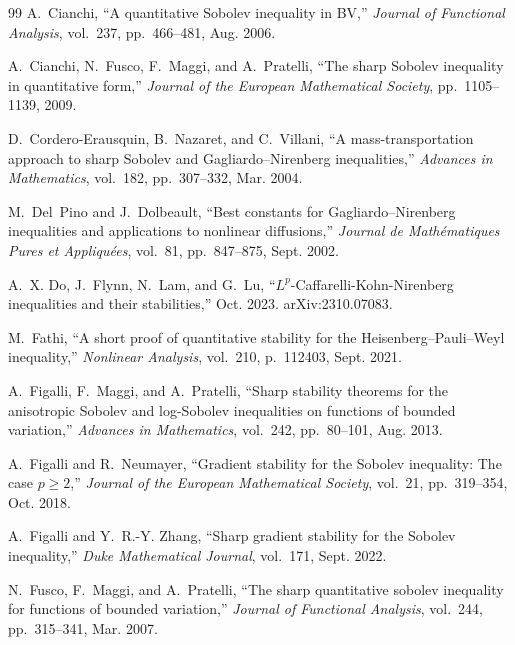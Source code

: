 \documentclass[11pt]{article}
\numberwithin{equation}{section}
\begin{document}
\begin{thebibliography}{99}
A.~Cianchi, ``A quantitative {Sobolev} inequality in {BV},'' {\em Journal of
  Functional Analysis}, vol.~237, pp.~466--481, Aug. 2006.


A.~Cianchi, N.~Fusco, F.~Maggi, and A.~Pratelli, ``The sharp {Sobolev}
  inequality in quantitative form,'' {\em Journal of the European Mathematical
  Society}, pp.~1105--1139, 2009.



D.~{Cordero-Erausquin}, B.~Nazaret, and C.~Villani, ``A mass-transportation
  approach to sharp {Sobolev} and {Gagliardo--Nirenberg} inequalities,'' {\em
  Advances in Mathematics}, vol.~182, pp.~307--332, Mar. 2004.


M.~Del~Pino and J.~Dolbeault, ``Best constants for {Gagliardo--Nirenberg}
  inequalities and applications to nonlinear diffusions,'' {\em Journal de
  Math{\'e}matiques Pures et Appliqu{\'e}es}, vol.~81, pp.~847--875, Sept.
  2002.





A.~X. Do, J.~Flynn, N.~Lam, and G.~Lu, ``{$L^p$-Caffarelli-Kohn-Nirenberg}
  inequalities and their stabilities,'' Oct. 2023.
\newblock arXiv:2310.07083.







M.~Fathi, ``A short proof of quantitative stability for the
  {Heisenberg--Pauli--Weyl} inequality,'' {\em Nonlinear Analysis}, vol.~210,
  p.~112403, Sept. 2021.

A.~Figalli, F.~Maggi, and A.~Pratelli, ``Sharp stability theorems for the
  anisotropic {Sobolev} and log-{Sobolev} inequalities on functions of bounded
  variation,'' {\em Advances in Mathematics}, vol.~242, pp.~80--101, Aug. 2013.


A.~Figalli and R.~Neumayer, ``Gradient stability for the {Sobolev} inequality:
  The case $p\geq 2$,'' {\em Journal of the European Mathematical Society},
  vol.~21, pp.~319--354, Oct. 2018.

A.~Figalli and Y.~R.-Y. Zhang, ``Sharp gradient stability for the {Sobolev}
  inequality,'' {\em Duke Mathematical Journal}, vol.~171, Sept. 2022.



N.~Fusco, F.~Maggi, and A.~Pratelli, ``The sharp quantitative sobolev
  inequality for functions of bounded variation,'' {\em Journal of Functional
  Analysis}, vol.~244, pp.~315--341, Mar. 2007.




\end{thebibliography}
\end{document}
